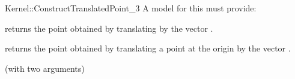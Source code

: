 \begin{ccRefFunctionObjectConcept}{Kernel::ConstructTranslatedPoint_3}
A model for this must provide:


       {returns the point obtained by translating  by the vector 
        .}

       {returns the point obtained by translating a point at the origin by the vector 
        .}

\ccRefines
{} (with two arguments)

\ccSeeAlso
{} \\

\end{ccRefFunctionObjectConcept}
